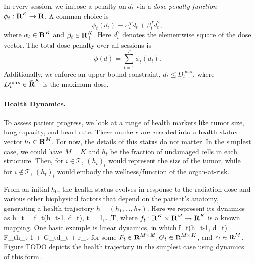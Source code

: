 \documentclass[12pt]{article}
\begin{document}
In every session, we impose a penalty on $d_t$ %
via a {\em dose penalty function} $\phi_t: {\mbox{\bf R}}^K \rightarrow {\mbox{\bf R}}$. A common choice is
\[
	\phi_t(d_t) = \alpha_t^Td_t + \beta_t^Td_t^2,
\]
where $\alpha_t \in {\mbox{\bf R}}^K$ and $\beta_t \in {\mbox{\bf R}}_+^K$. Here $d_t^2$ denotes the elementwise square of the dose vector. The total dose penalty over all sessions is
\[
	\phi(d) = \sum_{t=1}^T \phi_t(d_t).
\]
Additionally, we enforce an upper bound constraint, $d_t \leq D_t^{\max}$, where $D_t^{\max} \in \bar {{\mbox{\bf R}}}_+^K$ is the maximum dose.

\paragraph{Health Dynamics.} To assess patient progress, we look at a range of health markers like tumor size, lung capacity, and heart rate. These markers are encoded into a health status vector $h_t \in {\mbox{\bf R}}^M$. For now, the details of this status do not matter. %
In the simplest case, we could have $M = K$ and $h_t$ be the fraction of undamaged cells in each structure. Then, for $i \in \mathcal{T}$, $(h_t)_i$ would represent the size of the tumor, while for $i \notin \mathcal{T}$, $(h_t)_i$ would embody the wellness/function of the organ-at-risk.

From an initial $h_0$, the health status evolves in response to the radiation dose and various other biophysical factors  that depend on the patient's anatomy, generating a health trajectory $h = (h_1,\ldots,h_T)$. %
Here we represent its dynamics as
\BEQ
\label{eq:health_dynamics}
	h_t = f_t(h_{t-1}, d_t), \quad t = 1,\ldots,T,
\EEQ
where $f_t:{\mbox{\bf R}}^K \times {\mbox{\bf R}}^M \rightarrow {\mbox{\bf R}}^K$ is a known mapping. One basic example is linear dynamics, in which
\BEQ
\label{eq:health_dyn_linear}
	f_t(h_{t-1}, d_t) = F_th_{t-1} + G_td_t + r_t
\EEQ
for some $F_t \in {\mbox{\bf R}}^{M \times M}, G_t \in {\mbox{\bf R}}^{M \times K}$, and $r_t \in {\mbox{\bf R}}^M$. Figure TODO depicts the health trajectory in the simplest case using dynamics of this form.
\end{document}
